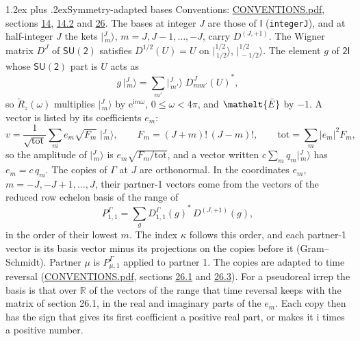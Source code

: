 \documentclass[10pt,a4paper]{article}
\makeatletter
\renewcommand\section{\@startsection{section}{1}{\z@}{-3ex plus -1ex minus -.2ex}%
  {1.2ex plus .2ex}{\normalfont\large\sffamily\bfseries\color{parttitle}}}
\numberwithin{equation}{section}
\newcommand{\eltfont}[1]{{\let\sigma\eltsigma\mathelt{#1}}}
\newcommand{\grp}[1]{\mathsf{#1}}
\newcommand{\elt}[1]{\eltfont{#1}}
\newcommand{\iunit}{\mathrm{i}}
\newcommand{\expe}{\mathrm{e}}
\newcommand{\irrJp}[2]{D^{(#1,#2)}}
\newcommand{\repD}[1]{D^{#1}}
\newcommand{\wignerD}[1]{D^{#1}}
\newcommand{\conj}[1]{{#1}^{*}}
\newcommand{\mult}{\kappa}
\newcommand{\intx}{\mu}
\newcommand{\jm}[2]{\bigl\lvert{}^{#1}_{\,#2}\bigr\rangle}
\newcommand{\barred}[1]{\bar{#1}}
\newcommand{\lift}[1]{\tilde{#1}}
\makeatother
\begin{document}
\section{Symmetry-adapted bases}\label{s:bases}
Conventions: \href{../../CONVENTIONS.pdf}{CONVENTIONS.pdf}, sections \href{../../../rotation/CONVENTIONS.pdf\#conv.14}{14}, \href{../../../rotation/CONVENTIONS.pdf\#conv.14.2}{14.2} and \href{../../CONVENTIONS.pdf\#conv.26}{26}.
\leavevmode\label{n:index.m}\label{n:vector.ket}The bases at integer $J$ are those of \href{../../../rotation/data/pdf/I.pdf}{$\grp{I}$} (\texttt{integerJ}), and at half-integer $J$ the kets $\jm{J}{m}$, $m = J, J-1, \dots, -J$, carry $\irrJp{J}{+1}$. \label{n:matrix.wigner}The Wigner matrix $\wignerD{J}$ of $\grp{SU(2)}$ satisfies $\wignerD{1/2}(U) = U$ on $\jm{1/2}{1/2}$, $\jm{1/2}{-1/2}$. The element $g$ of $\grp{2I}$ whose $\grp{SU(2)}$ part is $U$ acts as
\begin{equation}\label{e:action}g\,\jm{J}{m} = \sum_{m'} \jm{J}{m'}\; \conj{\wignerD{J}_{m m'}(U)},\end{equation}
so $\lift{R}_{z}(\omega)$ multiplies $\jm{J}{m}$ by $\expe^{\iunit m\omega}$, $0 \le \omega < 4\pi$, and $\elt{\barred{E}}$ by $-1$. \label{n:index.ketcoefficient}\label{n:vector.basis.symmetry}\label{n:index.ketweight}\label{n:index.total}A vector is listed by its coefficients $e_m$:
\begin{equation}\label{e:ket}v = \frac{1}{\sqrt{\mathrm{tot}}}\sum_m e_m\sqrt{F_m}\;\jm{J}{m},\qquad F_m = (J+m)!\,(J-m)!,\qquad \mathrm{tot} = \sum_m |e_m|^2F_m,\end{equation}
\leavevmode\label{n:index.factor.c}so the amplitude of $\jm{J}{m}$ is $e_m\sqrt{F_m/\mathrm{tot}}$, and a vector written $c\sum_m q_m\jm{J}{m}$ has $e_m = c\,q_m$.
The copies of $\Gamma$ at $J$ are orthonormal. \label{n:matrix.projector}In the coordinates $e_m$, $m = -J, -J+1, \dots, J$, their partner-1 vectors come from the vectors of the reduced row echelon basis of the range of
\begin{equation}\label{e:projector}P^\Gamma_{1,1} = \sum_g \conj{\repD{\Gamma}_{1,1}(g)}\,\irrJp{J}{+1}(g),\end{equation}
in the order of their lowest $m$. The index $\mult$ follows this order, and each partner-1 vector is its basis vector minus its projections on the copies before it (Gram--Schmidt). Partner $\intx$ is $P^\Gamma_{\intx,1}$ applied to partner 1. The copies are adapted to time reversal (\href{../../CONVENTIONS.pdf}{CONVENTIONS.pdf}, sections \href{../../CONVENTIONS.pdf\#conv.26.1}{26.1} and \href{../../CONVENTIONS.pdf\#conv.26.3}{26.3}). For a pseudoreal irrep the basis is that over $\mathbb{R}$ of the vectors of the range that time reversal keeps with the matrix of section 26.1, in the real and imaginary parts of the $e_m$. Each copy then has the sign that gives its first coefficient a positive real part, or makes it $\iunit$ times a positive number.
\end{document}
